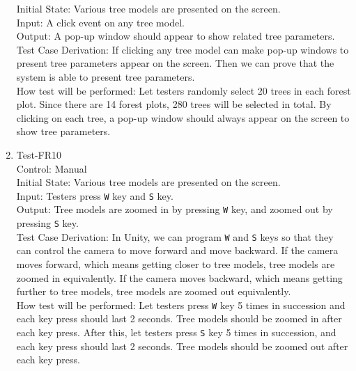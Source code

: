 \documentclass[12pt, titlepage]{article}
\begin{document}
\begin{enumerate}
Initial State: Various tree models are presented on the screen.\\

Input: A click event on any tree model.\\

Output: A pop-up window should appear to show related tree parameters.\\

Test Case Derivation: If clicking any tree model can make pop-up windows to present 
tree parameters appear on the screen. Then we can prove that the system is able
to present tree parameters.\\
					
How test will be performed:  Let testers randomly select 20 trees in each forest plot.
Since there are 14 forest plots, 280 trees will be selected in total. By clicking on
each tree, a pop-up window should always appear on the screen to show tree parameters.

\item{Test-FR10\\}
Control: Manual\\ 

Initial State: Various tree models are presented on the screen.\\

Input: Testers press \verb|W| key and \verb|S| key.\\

Output: Tree models are zoomed in by pressing \verb|W| key, and zoomed out
by pressing \verb|S| key.\\

Test Case Derivation: In Unity, we can program \verb|W| and \verb|S| keys so that 
they can control the camera to move forward and move backward. If the camera moves
forward, which means getting closer to tree models, tree models are zoomed in 
equivalently. If the camera moves backward, which means getting further to tree 
models, tree models are zoomed out equivalently.\\
					
How test will be performed: Let testers press \verb|W| key 5 times in succession 
and each key press should last 2 seconds. Tree models should be zoomed in after 
each key press. After this, let testers press \verb|S| key 5 times in succession,
and each key press should last 2 seconds. Tree models should be zoomed out after
each key press.


\end{enumerate}
\end{document}

